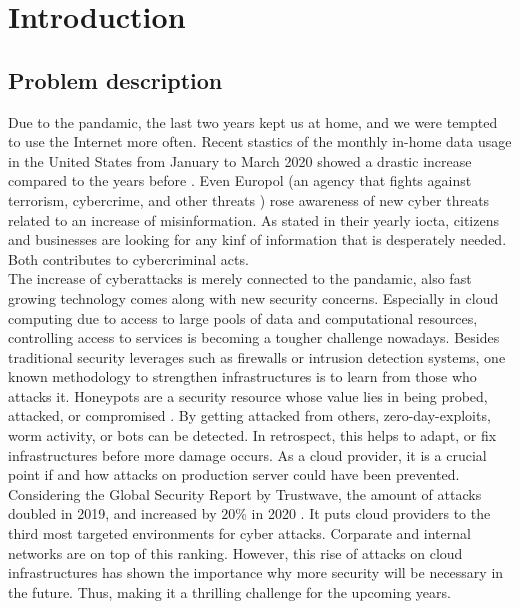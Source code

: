 \chapter{Introduction}


\section{Problem description}

Due to the pandamic, the last two years kept us at home, and we were tempted to use the Internet more often.
Recent stastics of the monthly in-home data usage in the United States from January to March 2020 showed a drastic increase compared to the years before \cite{statista2021}.
Even Europol (an agency that fights against terrorism, cybercrime, and other threats \cite{europol2021}) rose awareness of new cyber threats related to an increase of misinformation.
As stated in their yearly \ac{iocta}, citizens and businesses are looking for any kinf of information that is desperately needed.
Both contributes to cybercriminal acts. \cite{iocta2020}\\


The increase of cyberattacks is merely connected to the pandamic, also fast growing technology comes along with new security concerns.
Especially in cloud computing due to access to large pools of data and computational resources, controlling access to services is becoming a tougher challenge nowadays.
Besides traditional security leverages such as firewalls or intrusion detection systems, one known methodology to strengthen infrastructures is to learn from those who attacks it.
Honeypots are a security resource whose value lies in being probed, attacked, or compromised \cite{Spitzner2003}.
By getting attacked from others, zero-day-exploits, worm activity, or bots can be detected.
In retrospect, this helps to adapt, or fix infrastructures before more damage occurs. As a cloud provider, it is a crucial point if and how attacks on production server could have been prevented.
Considering the Global Security Report by Trustwave, the amount of attacks doubled in 2019, and increased by $20\%$ in 2020 \cite{fahim2020}.
It puts cloud providers to the third most targeted environments for cyber attacks. Corparate and internal networks are on top of this ranking.
However, this rise of attacks on cloud infrastructures has shown the importance why more security will be necessary in the future.
Thus, making it a thrilling challenge for the upcoming years.\\

